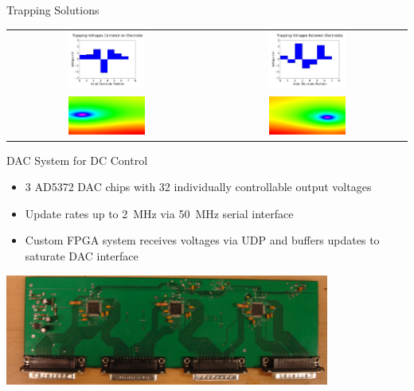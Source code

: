 \documentclass{beamer}
\begin{document}
\begin{frame}{Trapping Solutions}
	\begin{table}\begin{tabular}{cc}
		\centering
		\includegraphics[width=0.4\textwidth]{center_trap} &
		\includegraphics[width=0.4\textwidth]{inbetween_trap}  \\
		
		\includegraphics[width=0.4\textwidth]{yz_all_left} &
		\includegraphics[width=0.4\textwidth]{yz_all}
	\end{tabular}\end{table}
\end{frame}

\begin{frame}{DAC System for DC Control}
	\centering
	\begin{itemize}
		\item 3 AD5372 DAC chips with 32 individually controllable output voltages
		\item Update rates up to 2~MHz via 50~MHz serial interface
		\item Custom FPGA system receives voltages via UDP and buffers updates to saturate DAC interface
	\end{itemize}
	\vfill
	\centerline{\includegraphics[width=0.8\textwidth]{DAC_board}}
\end{frame}
\end{document}
